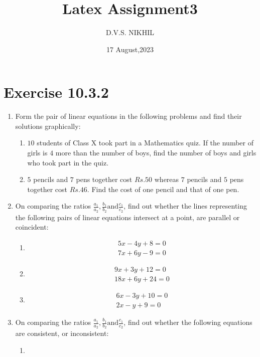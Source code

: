 \documentclass{article}
\theoremstyle{remark}
\begin{document}
\title{Latex Assignment3}
\author{D.V.S. NIKHIL}
\date{17 August,2023}
\maketitle
\section*{Exercise 10.3.2}
\begin{enumerate}
\item Form the pair of linear equations in the following problems and find their solutions graphically:
\begin{enumerate}[label=(\roman*)]
\item $10$ students of Class X took part in a Mathematics quiz. If the number of girls is $4$ more than the number of boys, find the number of boys and girls who took part in the quiz.
\item $5$ pencils and $7$ pens together cost $Rs. 50$ whereas $7$ pencils and $5$ pens together cost $Rs.46$. Find the cost of one pencil and that of one pen.
\end{enumerate}
\item On comparing the ratios $\frac{a_{1}}{a_2},\frac{b_1}{b_2} \text{and} \frac{c_1}{c_2}$, find out whether the lines representing the following pairs of linear equations intersect at a point, are parallel or coincident:
\begin{enumerate}[label=(\roman*)]
\item \begin{align}
	5x-4y+8=0\\ 
      	7x+6y-9=0
	\end{align}
\item \begin{align}
	9x+3y+12=0\\
	18x+6y+24=0
	\end{align}
\item \begin{align}
        6x-3y+10=0\\
	2x-y+9=0
	\end{align}
\end{enumerate}
\item On comparing the ratios $\frac{a_1}{a_2},\frac{b_1}{b_2} \text{and} \frac {c_1}{c_2}$, find out whether the following equations are consistent, or inconsistent:
\begin{enumerate}[label=(\roman*)]
	\item \begin{align}

\end{align}
\end{enumerate}
\end{enumerate}
\end{document}
